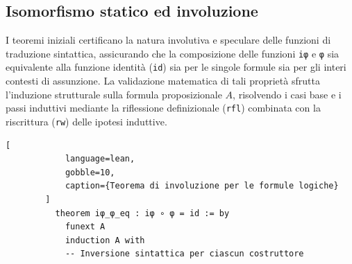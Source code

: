 \subsection{Isomorfismo statico ed involuzione}
I teoremi iniziali certificano la natura involutiva e speculare delle funzioni di traduzione sintattica, assicurando che la composizione delle funzioni \texttt{iφ} e \texttt{φ} sia equivalente alla funzione identità 
(\texttt{id}) sia per le singole formule sia per gli interi contesti di assunzione. La validazione matematica di tali proprietà sfrutta l'induzione strutturale sulla formula proposizionale $A$, risolvendo i casi base 
e i passi induttivi mediante la riflessione definizionale (\texttt{rfl}) combinata con la riscrittura (\texttt{rw}) delle ipotesi induttive.
\begin{center}
    \begin{minipage}{\textwidth}
        \begin{lstlisting}[
            language=lean, 
            gobble=10,
            caption={Teorema di involuzione per le formule logiche}
        ]
          theorem iφ_φ_eq : iφ ∘ φ = id := by
            funext A
            induction A with
            -- Inversione sintattica per ciascun costruttore
        \end{lstlisting}
    \end{minipage}
\end{center}

